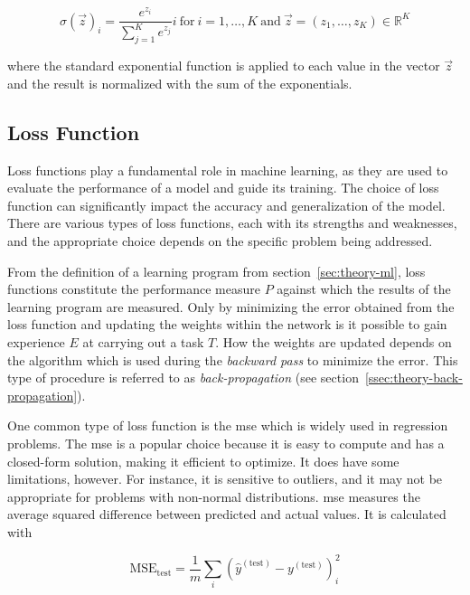 \documentclass[draft,final]{vutinfth} %
\begin{document}
\begin{equation}
  \label{eq:softmax}
  \sigma(\vec{z})_{i} = \frac{e^{z_i}}{\sum_{j=1}^Ke^{z_j}}i\ \mathrm{for}\ i = 1,\dots,K\ \mathrm{and}\ \vec{z} = (z_1,\dots,z_K)\in\mathbb{R}^K
\end{equation}

where the standard exponential function is applied to each value in
the vector $\vec{z}$ and the result is normalized with the sum of the
exponentials.

\subsection{Loss Function}
\label{ssec:theory-loss-function}

Loss functions play a fundamental role in machine learning, as they
are used to evaluate the performance of a model and guide its
training. The choice of loss function can significantly impact the
accuracy and generalization of the model. There are various types of
loss functions, each with its strengths and weaknesses, and the
appropriate choice depends on the specific problem being addressed.

From the definition of a learning program from
section~\ref{sec:theory-ml}, loss functions constitute the performance
measure $P$ against which the results of the learning program are
measured. Only by minimizing the error obtained from the loss function
and updating the weights within the network is it possible to gain
experience $E$ at carrying out a task $T$. How the weights are updated
depends on the algorithm which is used during the \emph{backward pass}
to minimize the error. This type of procedure is referred to as
\emph{back-propagation} (see
section~\ref{ssec:theory-back-propagation}).

One common type of loss function is the \gls{mse} which is widely used
in regression problems. The \gls{mse} is a popular choice because it
is easy to compute and has a closed-form solution, making it efficient
to optimize. It does have some limitations, however. For instance, it
is sensitive to outliers, and it may not be appropriate for problems
with non-normal distributions. \gls{mse} measures the average squared
difference between predicted and actual values. It is calculated with

\begin{equation}
  \label{eq:mse}
  \mathrm{MSE_{test}} = \frac{1}{m}\sum_i(\hat{y}^{(\mathrm{test})} - y^{(\mathrm{test})})_i^2
\end{equation}
\end{document}

